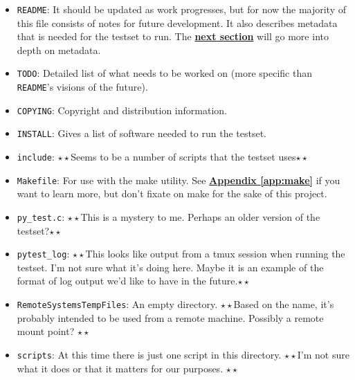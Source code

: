 \documentclass{report}
\newcommand{\dstar}{$\star\star$}	%
\begin{document}
\begin{itemize}
	\item \texttt{README}: It should be updated as work progresses, but for now the majority of this file consists of notes for future development. It also describes metadata that is needed for the testset to run. The \hyperref[subsec:medium]{\textbf{next section}} will go more into depth on metadata.
	\item \texttt{TODO}: Detailed list of what needs to be worked on (more specific than \texttt{README}'s visions of the future).
	\item \texttt{COPYING}: Copyright and distribution information.
	\item \texttt{INSTALL}: Gives a list of software needed to run the testset.
	\item \texttt{include}: \dstar Seems to be a number of scripts that the testset uses\dstar
	\item \texttt{Makefile}: For use with the make utility. See \hyperref[app:make]{\textbf{Appendix \ref{app:make}}} if you want to learn more, but don't fixate on make for the sake of this project.
	\item \texttt{py\_test.c}: \dstar This is a mystery to me. Perhaps an older version of the testset?\dstar
	\item \texttt{pytest\_log}: \dstar This looks like output from a tmux session when running the testset. I'm not sure what it's doing here. Maybe it is an example of the format of log output we'd like to have in the future.\dstar
	\item \texttt{RemoteSystemsTempFiles}: An empty directory. \dstar Based on the name, it's probably intended to be used from a remote machine. Possibly a remote mount point? \dstar
	\item \texttt{scripts}: At this time there is just one script in this directory. \dstar I'm not sure what it does or that it matters for our purposes. \dstar
\end{itemize}
\end{document}
